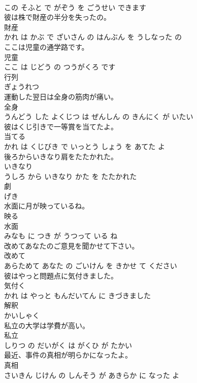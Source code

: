 \documentclass[8pt]{extreport}
\begin{document}
\begin{CJK}{UTF8}{min}
\\	この そふと で がぞう を ごうせい できます			
\\	彼は株で財産の半分を失ったの。	
\\	財産 
\\	かれ は かぶ で ざいさん の はんぶん を うしなった の			
\\	ここは児童の通学路です。	
\\	児童 
\\	ここ は じどう の つうがくろ です			
\\	行列	
\\	ぎょうれつ		
\\	運動した翌日は全身の筋肉が痛い。	
\\	全身 
\\	うんどう した よくじつ は ぜんしん の きんにく が いたい			
\\	彼はくじ引きで一等賞を当てたよ。	
\\	当てる 
\\	かれ は くじびき で いっとう しょう を あてた よ			
\\	後ろからいきなり肩をたたかれた。	
\\	いきなり 
\\	うしろ から いきなり かた を たたかれた			
\\	劇	
\\	げき		
\\	水面に月が映っているね。	
\\	映る 
\\	水面 
\\	みなも に つき が うつって いる ね			
\\	改めてあなたのご意見を聞かせて下さい。	
\\	改めて 
\\	あらためて あなた の ごいけん を きかせ て ください			
\\	彼はやっと問題点に気付きました。	
\\	気付く 
\\	かれ は やっと もんだいてん に きづきました			
\\	解釈	
\\	かいしゃく		
\\	私立の大学は学費が高い。	
\\	私立 
\\	しりつ の だいがく は がくひ が たかい			
\\	最近、事件の真相が明らかになったよ。	
\\	真相 
\\	さいきん じけん の しんそう が あきらか に なった よ			

\end{CJK}
\end{document}
